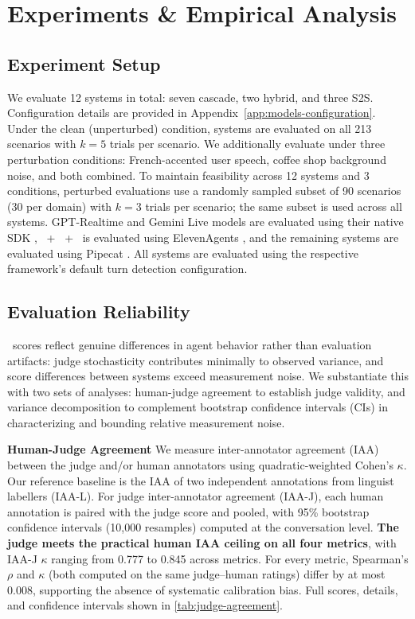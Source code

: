 \section{Experiments \& Empirical Analysis}
\label{sec:experiments}

\subsection{Experiment Setup}
\label{sec: experiment-setup}

We evaluate 12 systems in total: seven cascade, two hybrid, and three S2S. Configuration details are provided in Appendix~\ref{app:models-configuration}. Under the clean (unperturbed) condition, systems are evaluated on all 213 scenarios with $k = 5$  trials per scenario. We additionally evaluate under three perturbation conditions: French-accented user speech, coffee shop background noise, and both combined. To maintain feasibility across 12 systems and 3 conditions, perturbed evaluations use a randomly sampled subset of 90 scenarios (30 per domain) with $k = 3$ trials per scenario; the same subset is used across all systems. GPT-Realtime and Gemini Live models are evaluated using their native SDK \cite{google2024liveapi, openai2024realtimeapi}, \scribefull~+ \geminiflashfull~+ \conversationalfull~is evaluated using ElevenAgents \cite{elevenlabs2024agents}, and the remaining systems are evaluated using Pipecat \cite{pipecat2024}. All systems are evaluated using the respective framework's default turn detection configuration.


\subsection{Evaluation Reliability}
\label{sec: evaluation-reliability}

\framework~scores reflect genuine differences in agent behavior rather than evaluation artifacts: judge stochasticity contributes minimally to observed variance, and score differences between systems exceed measurement noise. We substantiate this with two sets of analyses: human-judge agreement to establish judge validity, and variance decomposition to complement bootstrap confidence intervals (CIs) in characterizing and bounding relative measurement noise.

\textbf{Human-Judge Agreement}
We measure inter-annotator agreement (IAA) between the judge and/or human annotators using quadratic-weighted Cohen's $\kappa$. Our reference baseline is the IAA of two independent annotations from linguist labellers (IAA-L). For judge inter-annotator agreement (IAA-J), each human annotation is paired with the judge score and pooled, with 95\% bootstrap confidence intervals (10{,}000 resamples) computed at the conversation level. \textbf{The judge meets the practical human IAA ceiling on all four metrics}, with IAA-J $\kappa$ ranging from 0.777 to 0.845 across metrics. For every metric, Spearman's $\rho$ and $\kappa$ (both computed on the same judge–human ratings) differ by at most 0.008, supporting the absence of systematic calibration bias. Full scores, details, and confidence intervals shown in \autoref{tab:judge-agreement}. 

